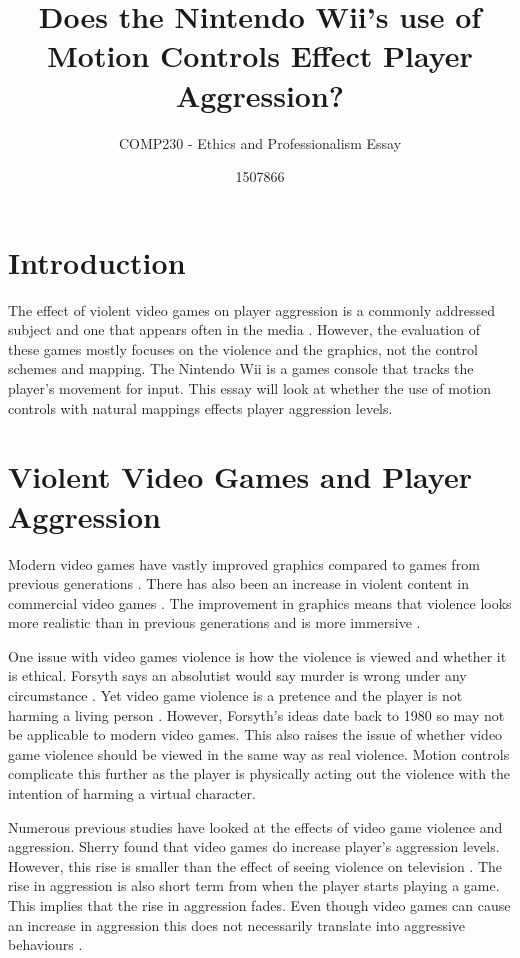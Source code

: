 \documentclass{scrartcl}
\title{ Does the Nintendo Wii's use of Motion Controls Effect Player Aggression? }
\subtitle{COMP230 - Ethics and Professionalism Essay}
\author{1507866}
\begin{document}
	
\maketitle
	
	
\section{Introduction}
The effect of violent video games on player aggression is a commonly addressed subject and one that appears often in the media \cite{DailyMail, GuardianAggression, CBSNews}.
However, the evaluation of these games mostly focuses on the violence and the graphics, not the control schemes and mapping.  The Nintendo Wii is a games console that tracks the player's movement for input. This essay will look at whether the use of motion controls with natural mappings effects player aggression levels.

\section{Violent Video Games and Player Aggression} 
Modern video games have vastly improved graphics compared to games from previous generations \cite{Fumhe}.  There has also been an increase in violent content in commercial video games \cite{Fumhe}. The improvement in graphics means that violence looks more realistic than in previous generations and is more immersive \cite{Kim}.

\bigskip
One issue with video games violence is how the violence is viewed and whether it is ethical. Forsyth says an absolutist would say murder is wrong under any circumstance \cite{forsyth}. 
Yet video game violence is a pretence and the player is not harming a living person \cite{Tavinor}. 
However, Forsyth's ideas date back to 1980 so may not be applicable to modern video games. \cite{forsyth}
This also raises the issue of whether video game violence should be viewed in the same way as real violence.
Motion controls complicate this further as the player is physically acting out the violence with the intention of harming a virtual character. 

\bigskip
Numerous previous studies have looked at the effects of video game violence and aggression.  Sherry found that video games do increase player's aggression levels.  However, this rise is smaller than the effect of seeing violence on television \cite{sherry2001effects}.
The rise in aggression is also short term from when the player starts playing a game.  This implies that the rise in aggression fades.  Even though video games can cause an increase in aggression this does not necessarily translate into aggressive behaviours \cite{Ferguson}.
\end{document}
